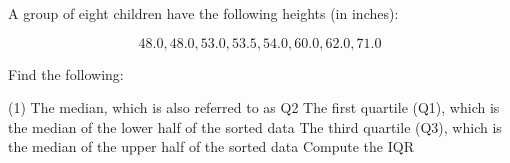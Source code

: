 \documentclass[../mathNotesPreamble]{subfiles}
\begin{document}
  \begin{ex*}
    A group of eight children have the following heights (in inches):
    
    \noindent
    \begin{minipage}{0.4\linewidth}
      \[48.0, 48.0, 53.0, 53.5, 54.0, 60.0, 62.0, 71.0\]
    \end{minipage}
    \begin{minipage}{0.575\linewidth}
      \centering
    \end{minipage}
    \vspace*{\baselineskip}
    
    \noindent
    Find the following:
    \begin{tasks}[after-item-skip=\stretch{1}, label=\textbullet](1)
      \task The median, which is also referred to as Q2
      \task The first quartile (Q1), which is the median of the lower half of the sorted data
      \task The third quartile (Q3), which is the median of the upper half of the sorted data
      \task Compute the IQR
    \end{tasks}
  \end{ex*}

  \pagebreak
\end{document}
